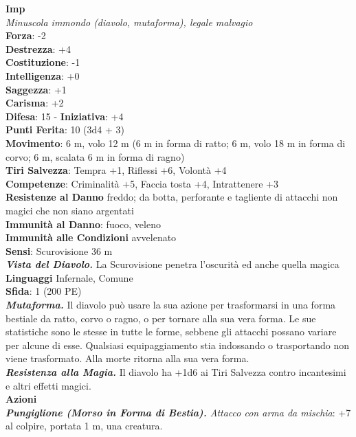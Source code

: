 \begin{multicols}{2}
\medskip\textbf{Imp}\\
\emph{Minuscola immondo (diavolo, mutaforma), legale malvagio}\\
\textbf{Forza}: -2\\
\textbf{Destrezza}: +4\\
\textbf{Costituzione}: -1\\
\textbf{Intelligenza}: +0\\
\textbf{Saggezza}: +1\\
\textbf{Carisma}: +2\\
\textbf{Difesa}: 15 - \textbf{Iniziativa}: +4\\
\textbf{Punti Ferita}: 10 (3d4 + 3)\\
\textbf{Movimento}: 6 m, volo 12 m (6 m in forma di ratto; 6 m, volo 18 m in forma di corvo; 6 m, scalata 6 m in forma di ragno)\\
\textbf{Tiri Salvezza}: Tempra +1, Riflessi +6, Volontà +4\\
\textbf{Competenze}: Criminalità +5, Faccia tosta +4, Intrattenere +3\\
\textbf{Resistenze al Danno} freddo; da botta, perforante e tagliente di attacchi non magici che non siano argentati\\
\textbf{Immunità al Danno}: fuoco, veleno\\
\textbf{Immunità alle Condizioni} avvelenato\\
\textbf{Sensi}: Scurovisione 36 m\\
\emph{\textbf{Vista del Diavolo.}} La Scurovisione penetra l'oscurità ed anche quella magica\\
\textbf{Linguaggi} Infernale, Comune\\
\textbf{Sfida}: 1 (200 PE)\smallskip\\
\emph{\textbf{Mutaforma.}} Il diavolo può usare la sua azione per trasformarsi in una forma bestiale da ratto, corvo o ragno, o per tornare alla sua vera forma. Le sue statistiche sono le stesse in tutte le forme, sebbene gli attacchi possano variare per alcune di esse. Qualsiasi equipaggiamento stia indossando o trasportando non viene trasformato. Alla morte ritorna alla sua vera forma. \\
\emph{\textbf{Resistenza alla Magia.}} Il diavolo ha +1d6 ai Tiri Salvezza contro incantesimi e altri effetti magici.\\
\smallskip\textbf{Azioni}\\
\emph{\textbf{Pungiglione (Morso in Forma di Bestia).} Attacco con arma da mischia}: +7 al colpire, portata 1 m, una creatura.\\

\end{multicols}
